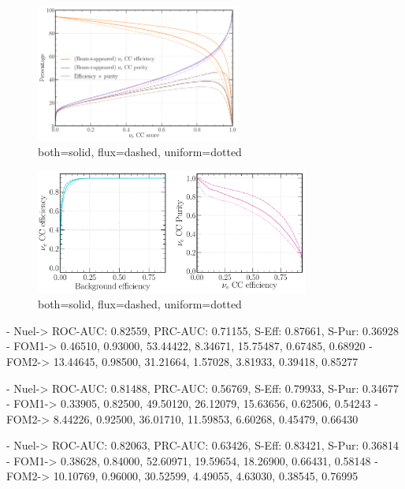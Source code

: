 \begin{figure} %
    \includegraphics[width=0.6\textwidth]{diagrams/7-cvn/chipsnet/sample_nuel_eff_curves.pdf}
    \caption[sample nuel eff curves short]
    {both=solid, flux=dashed, uniform=dotted}
    \label{fig:sample_nuel_eff_curves}
\end{figure}

\begin{figure} %
    \includegraphics[width=0.8\textwidth]{diagrams/7-cvn/chipsnet/sample_nuel_comp_curves.pdf}
    \caption[sample nuel comp curves short]
    {both=solid, flux=dashed, uniform=dotted}
    \label{fig:sample_nuel_comp_curves}
\end{figure}

- Nuel-> ROC-AUC: 0.82559, PRC-AUC: 0.71155, S-Eff: 0.87661, S-Pur: 0.36928
- FOM1-> 0.46510, 0.93000, 53.44422, 8.34671, 15.75487, 0.67485, 0.68920
- FOM2-> 13.44645, 0.98500, 31.21664, 1.57028, 3.81933, 0.39418, 0.85277

- Nuel-> ROC-AUC: 0.81488, PRC-AUC: 0.56769, S-Eff: 0.79933, S-Pur: 0.34677
- FOM1-> 0.33905, 0.82500, 49.50120, 26.12079, 15.63656, 0.62506, 0.54243
- FOM2-> 8.44226, 0.92500, 36.01710, 11.59853, 6.60268, 0.45479, 0.66430

- Nuel-> ROC-AUC: 0.82063, PRC-AUC: 0.63426, S-Eff: 0.83421, S-Pur: 0.36814
- FOM1-> 0.38628, 0.84000, 52.60971, 19.59654, 18.26900, 0.66431, 0.58148
- FOM2-> 10.10769, 0.96000, 30.52599, 4.49055, 4.63030, 0.38545, 0.76995

